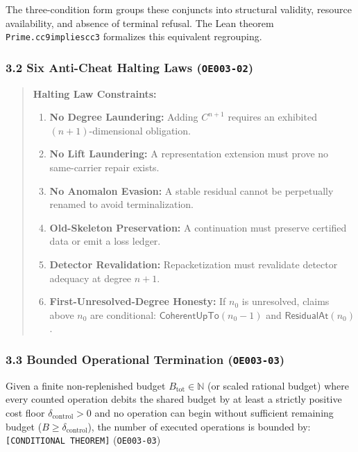 \documentclass[
  11pt,
]{article}
\providecommand{\tightlist}{%
  \setlength{\itemsep}{0pt}\setlength{\parskip}{0pt}}
\renewcommand{\_}{\origunderscore\allowbreak}
\begin{document}
The three-condition form groups these conjuncts into structural
validity, resource availability, and absence of terminal refusal. The
Lean theorem \texttt{Prime.cc9\_implies\_cc3} formalizes this equivalent
regrouping.

\subsubsection{\texorpdfstring{3.2 Six Anti-Cheat Halting Laws
(\texttt{OE003-02})}{3.2 Six Anti-Cheat Halting Laws (OE003-02)}}\label{six-anti-cheat-halting-laws-oe003-02}

\begin{quote}
\textbf{Halting Law Constraints:}

\begin{enumerate}
\def\labelenumi{\arabic{enumi}.}
\tightlist
\item
  \textbf{No Degree Laundering:} Adding \(C^{n+1}\) requires an
  exhibited \((n+1)\)-dimensional obligation.
\item
  \textbf{No Lift Laundering:} A representation extension must prove no
  same-carrier repair exists.
\item
  \textbf{No Anomalon Evasion:} A stable residual cannot be perpetually
  renamed to avoid terminalization.
\item
  \textbf{Old-Skeleton Preservation:} A continuation must preserve
  certified data or emit a loss ledger.
\item
  \textbf{Detector Revalidation:} Repacketization must revalidate
  detector adequacy at degree \(n+1\).
\item
  \textbf{First-Unresolved-Degree Honesty:} If \(n_0\) is unresolved,
  claims above \(n_0\) are conditional: \(\mathsf{CoherentUpTo}(n_0-1)\)
  and \(\mathsf{ResidualAt}(n_0)\).
\end{enumerate}
\end{quote}

\subsubsection{\texorpdfstring{3.3 Bounded Operational Termination
(\texttt{OE003-03})}{3.3 Bounded Operational Termination (OE003-03)}}\label{bounded-operational-termination-oe003-03}

Given a finite non-replenished budget \(B_{\text{tot}} \in \mathbb{N}\)
(or scaled rational budget) where every counted operation debits the
shared budget by at least a strictly positive cost floor
\(\delta_{\text{control}} > 0\) and no operation can begin without
sufficient remaining budget (\(B \ge \delta_{\text{control}}\)), the
number of executed operations is bounded by:
\texttt{{[}CONDITIONAL\ THEOREM{]}} (\texttt{OE003-03})
\end{document}
